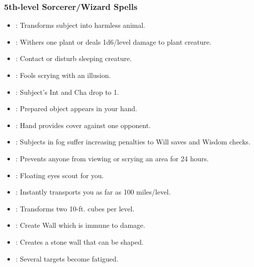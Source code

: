 \subsubsection{5th-level Sorcerer/Wizard Spells}
\begin{itemize} 
\item {}: Transforms subject into harmless animal.
\item {}: Withers one plant or deals 1d6/level damage to plant creature.
\item {}: Contact or disturb sleeping creature.
\item {}: Fools scrying with an illusion.
\item {}: Subject's Int and Cha drop to 1.
\item {}: Prepared object appears in your hand.
\item {}: Hand provides cover against one opponent.
\item {}: Subjects in fog suffer increasing penalties to Will saves and Wisdom checks.
\item {}: Prevents anyone from viewing or scrying an area for 24 hours.
\item {}: Floating eyes scout for you.
\item {}: Instantly transports you as far as 100 miles/level.
\item {}: Transforms two 10-ft. cubes per level.
\item {}: Create Wall which is immune to damage.
\item {}: Creates a stone wall that can be shaped.
\item {}: Several targets become fatigued.
\end{itemize}
